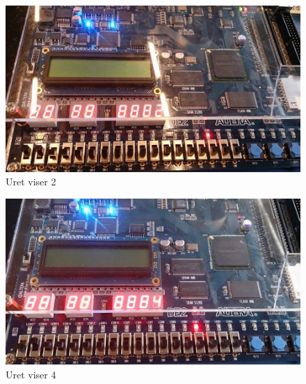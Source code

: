 \begin{enumerate}
		\begin{figure}[h]
			\centering
			\includegraphics[scale=0.3]{pictures/Oevelse6/opg1/watch2.JPG}
			\caption{Uret viser 2}
			\label{fig:alarm2}
		\end{figure}

		\begin{figure}[h]
			\centering
			\includegraphics[scale=0.3]{pictures/Oevelse6/opg1/watch4.JPG}
			\caption{Uret viser 4}
			\label{fig:alarm4}
		\end{figure}


\end{enumerate}